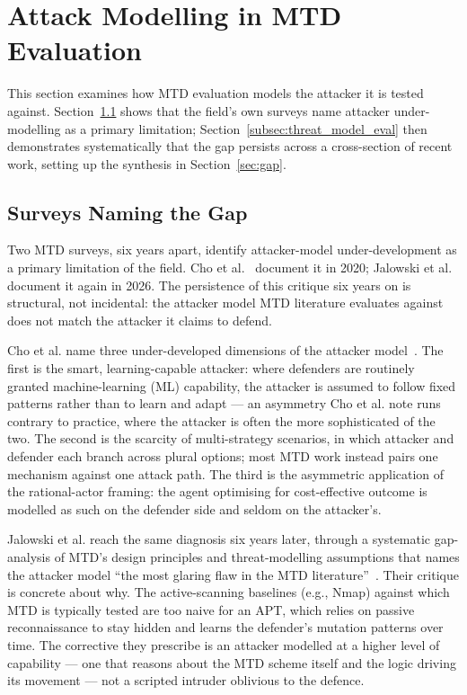 
\section{Attack Modelling in MTD Evaluation}
\label{sec:convergence}

This section examines how MTD evaluation models the attacker it is tested against. Section~\ref{subsec:attackers_mtd} shows that the field's own surveys name attacker under-modelling as a primary limitation; Section~\ref{subsec:threat_model_eval} then demonstrates systematically that the gap persists across a cross-section of recent work, setting up the synthesis in Section~\ref{sec:gap}.



\subsection{Surveys Naming the Gap}
\label{subsec:attackers_mtd}

Two MTD surveys, six years apart, identify attacker-model under-development as a primary limitation of the field. Cho et al.~\cite{cho2020} document it in 2020; Jalowski et al.~\cite{jalowski2026} document it again in 2026. The persistence of this critique six years on is structural, not incidental: the attacker model MTD literature evaluates against does not match the attacker it claims to defend.

Cho et al. name three under-developed dimensions of the attacker model~\cite[Sec.~V-D]{cho2020}. The first is the smart, learning-capable attacker: where defenders are routinely granted machine-learning (ML) capability, the attacker is assumed to follow fixed patterns rather than to learn and adapt --- an asymmetry Cho et al. note runs contrary to practice, where the attacker is often the more sophisticated of the two. The second is the scarcity of multi-strategy scenarios, in which attacker and defender each branch across plural options; most MTD work instead pairs one mechanism against one attack path. The third is the asymmetric application of the rational-actor framing: the agent optimising for cost-effective outcome is modelled as such on the defender side and seldom on the attacker's.

Jalowski et al. reach the same diagnosis six years later, through a systematic gap-analysis of MTD's design principles and threat-modelling assumptions that names the attacker model ``the most glaring flaw in the MTD literature''~\cite[p.~8]{jalowski2026}. Their critique is concrete about why. The active-scanning baselines (e.g., Nmap) against which MTD is typically tested are too naive for an APT, which relies on passive reconnaissance to stay hidden and learns the defender's mutation patterns over time. The corrective they prescribe is an attacker modelled at a higher level of capability --- one that reasons about the MTD scheme itself and the logic driving its movement --- not a scripted intruder oblivious to the defence.

